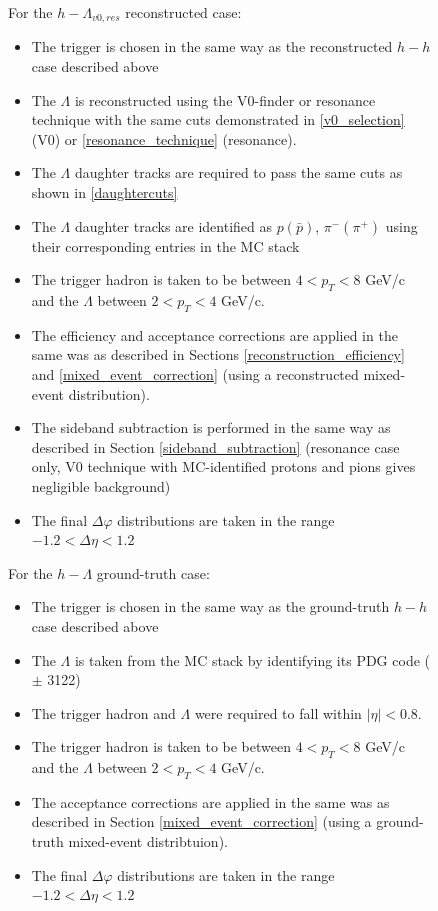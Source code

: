 \documentclass[ALICE,manyauthors]{ALICE_analysis_notes}
\begin{document}
\begin{figure}[ht]
For the $h-\Lambda_{v0, res}$ reconstructed case: 
\begin{itemize}
\item The trigger is chosen in the same way as the reconstructed $h-h$ case described above
\item The $\Lambda$ is reconstructed using the V0-finder or resonance technique with the same cuts demonstrated in \Section \ref{v0_selection} (V0) or \Section \ref{resonance_technique} (resonance).
\item The $\Lambda$ daughter tracks are required to pass the same cuts as shown in \Section \ref{daughtercuts}
\item The $\Lambda$ daughter tracks are identified as $p (\bar{p})$, $\pi^{-} (\pi^{+})$ using their corresponding entries in the MC stack
\item The trigger hadron is taken to be between $4 < p_{T} < 8$ GeV/c and the $\Lambda$ between $2 < p_{T} < 4$ GeV/c. 
\item The efficiency and acceptance corrections are applied in the same was as described in Sections \ref{reconstruction_efficiency} and \ref{mixed_event_correction} (using a reconstructed mixed-event distribution). 
\item The sideband subtraction is performed in the same way as described in Section \ref{sideband_subtraction} (resonance case only, V0 technique with MC-identified protons and pions gives negligible background)
\item The final $\Delta\varphi$ distributions are taken in the range $-1.2 < \Delta\eta < 1.2$
\end{itemize}

For the $h-\Lambda$ ground-truth case: 
\begin{itemize}
\item The trigger is chosen in the same way as the ground-truth $h-h$ case described above
\item The $\Lambda$ is taken from the MC stack by identifying its PDG code ($\pm$ 3122)
\item The trigger hadron and $\Lambda$ were required to fall within $|\eta| < 0.8$.
\item The trigger hadron is taken to be between $4 < p_{T} < 8$ GeV/c and the $\Lambda$ between $2 < p_{T} < 4$ GeV/c. 
\item The acceptance corrections are applied in the same was as described in Section \ref{mixed_event_correction} (using a ground-truth mixed-event distribtuion). 
\item The final $\Delta\varphi$ distributions are taken in the range $-1.2 < \Delta\eta < 1.2$
\end{itemize}


\end{figure}
\end{document}
